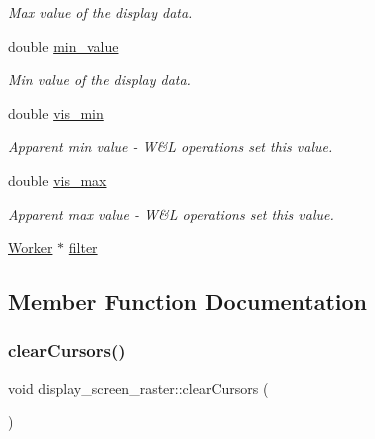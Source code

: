 \begin{DoxyCompactItemize}
\begin{DoxyCompactList}\small\item\em Max value of the display data. \end{DoxyCompactList}\item 
\mbox{\label{classdisplay__screen_a3091e35b28219274fe9ffd8e8dc68c40}} 
double \mbox{\hyperlink{classdisplay__screen_a3091e35b28219274fe9ffd8e8dc68c40}{min\+\_\+value}}
\begin{DoxyCompactList}\small\item\em Min value of the display data. \end{DoxyCompactList}\item 
\mbox{\label{classdisplay__screen_a0a040ebfadeba044ee2d887c43b37425}} 
double \mbox{\hyperlink{classdisplay__screen_a0a040ebfadeba044ee2d887c43b37425}{vis\+\_\+min}}
\begin{DoxyCompactList}\small\item\em Apparent min value -\/ W\&L operations set this value. \end{DoxyCompactList}\item 
\mbox{\label{classdisplay__screen_a100a772813944bb4a41feab579ae11d8}} 
double \mbox{\hyperlink{classdisplay__screen_a100a772813944bb4a41feab579ae11d8}{vis\+\_\+max}}
\begin{DoxyCompactList}\small\item\em Apparent max value -\/ W\&L operations set this value. \end{DoxyCompactList}\item 
\mbox{\hyperlink{classWorker}{Worker}} $\ast$ \mbox{\hyperlink{classdisplay__screen_a54ed0638f240e4a044d9d4376233ec71}{filter}}
\end{DoxyCompactItemize}


\subsection{Member Function Documentation}
\mbox{\label{classdisplay__screen__raster_a0469e5189411a5b83d6386510832d46d}} 
\subsubsection{\texorpdfstring{clear\+Cursors()}{clearCursors()}}
{\footnotesize\ttfamily void display\+\_\+screen\+\_\+raster\+::clear\+Cursors (\begin{DoxyParamCaption}{ }\end{DoxyParamCaption})\hspace{0.3cm}{\ttfamily [virtual]}}

